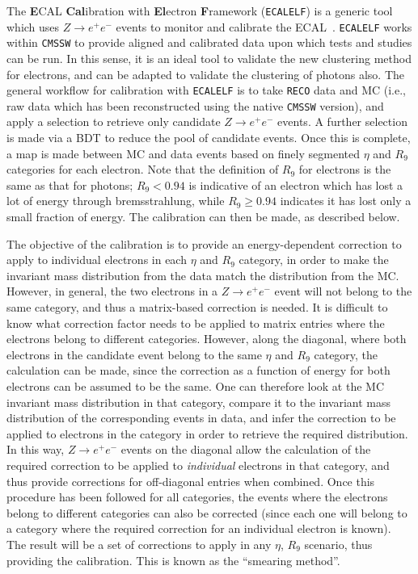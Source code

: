 \documentclass[10pt]{article}
\begin{document}
The \textbf{E}CAL \textbf{Cal}ibration with \textbf{El}ectron \textbf{F}ramework (\texttt{ECALELF}) is a generic tool which uses $Z \rightarrow e^+ e^-$ events to monitor and calibrate the ECAL~\cite{ecalelf}. \texttt{ECALELF} works within \texttt{CMSSW} to provide aligned and calibrated data upon which tests and studies can be run. In this sense, it is an ideal tool to validate the new clustering method for electrons, and can be adapted to validate the clustering of photons also. The general workflow for calibration with \texttt{ECALELF} is to take \texttt{RECO} data and MC (i.e., raw data which has been reconstructed using the native \texttt{CMSSW} version), and apply a selection to retrieve only candidate $Z \rightarrow e^+ e^-$ events. A further selection is made via a BDT to reduce the pool of candidate events. Once this is complete, a map is made between MC and data events based on finely segmented $\eta$ and $R_9$ categories for each electron. Note that the definition of $R_9$ for electrons is the same as that for photons; $R_9 < 0.94$ is indicative of an electron which has lost a lot of energy through bremsstrahlung, while $R_9 \geq 0.94$ indicates it has lost only a small fraction of energy. The calibration can then be made, as described below.

The objective of the calibration is to provide an energy-dependent correction to apply to individual electrons in each $\eta$ and $R_9$ category, in order to make the invariant mass distribution from the data match the distribution from the MC. However, in general, the two electrons in a $Z \rightarrow e^+ e^-$ event will not belong to the same category, and thus a matrix-based correction is needed. It is difficult to know what correction factor needs to be applied to matrix entries where the electrons belong to different categories. However, along the diagonal, where both electrons in the candidate event belong to the same $\eta$ and $R_9$ category, the calculation can be made, since the correction as a function of energy for both electrons can be assumed to be the same. One can therefore look at the MC invariant mass distribution in that category, compare it to the invariant mass distribution of the corresponding events in data, and infer the correction to be applied to electrons in the category in order to retrieve the required distribution. In this way, $Z \rightarrow e^+ e^-$ events on the diagonal allow the calculation of the required correction to be applied to \textit{individual} electrons in that category, and thus provide corrections for off-diagonal entries when combined. Once this procedure has been followed for all categories, the events where the electrons belong to different categories can also be corrected (since each one will belong to a category where the required correction for an individual electron is known). The result will be a set of corrections to apply in any $\eta$, $R_9$ scenario, thus providing the calibration. This is known as the ``smearing method''. 
\end{document}
